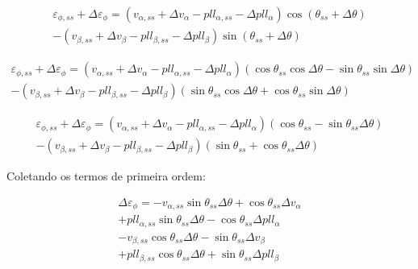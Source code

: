 \documentclass[12pt,a4paper]{report}
\begin{document}
\begin{multline}
\varepsilon_{\phi,ss} + \Delta \varepsilon_\phi =
\left(
v_{\alpha,ss} + \Delta v_{\alpha} 
- pll_{\alpha,ss} - \Delta pll_\alpha
\right)
\cos (\theta_{ss} + \Delta \theta)\\ -
\left(
v_{\beta,ss} + \Delta v_\beta 
- pll_{\beta,ss} - \Delta pll_\beta
\right)
\sin (\theta_{ss} + \Delta \theta )
\end{multline}



\begin{multline}
\varepsilon_{\phi,ss} + \Delta \varepsilon_\phi =
\left(
v_{\alpha,ss} + \Delta v_{\alpha} 
- pll_{\alpha,ss} - \Delta pll_\alpha
\right)
\left(
\cos \theta_{ss} \cos \Delta \theta -
\sin \theta_{ss} \sin \Delta \theta
\right)\\ -
\left(
v_{\beta,ss} + \Delta v_\beta 
- pll_{\beta,ss} - \Delta pll_\beta
\right)
\left(
\sin \theta_{ss} \cos \Delta \theta +
\cos \theta_{ss} \sin \Delta \theta
\right)
\end{multline}








\begin{multline}
\varepsilon_{\phi,ss} + \Delta \varepsilon_\phi =
\left(
v_{\alpha,ss} + \Delta v_{\alpha} 
- pll_{\alpha,ss} - \Delta pll_\alpha
\right)
\left(
\cos \theta_{ss}  -
\sin \theta_{ss}  \Delta \theta
\right)\\ -
\left(
v_{\beta,ss} + \Delta v_\beta 
- pll_{\beta,ss} - \Delta pll_\beta
\right)
\left(
\sin \theta_{ss}  +
\cos \theta_{ss}  \Delta \theta
\right)
\end{multline}


Coletando os termos de primeira ordem:


\begin{multline}
\Delta \varepsilon_\phi = 
-v_{\alpha,ss} \sin \theta_{ss}  \Delta \theta
+\cos \theta_{ss} \Delta v_{\alpha} \\
+pll_{\alpha,ss} \sin \theta_{ss}  \Delta \theta
- \cos \theta_{ss}  \Delta pll_\alpha \\
- v_{\beta,ss} \cos \theta_{ss}  \Delta \theta
- \sin \theta_{ss} \Delta v_\beta \\
+ pll_{\beta,ss} \cos \theta_{ss}  \Delta \theta
+ \sin \theta_{ss}  \Delta pll_\beta
\label{eq:erro:phi:Lin}
\end{multline}
\end{document}
